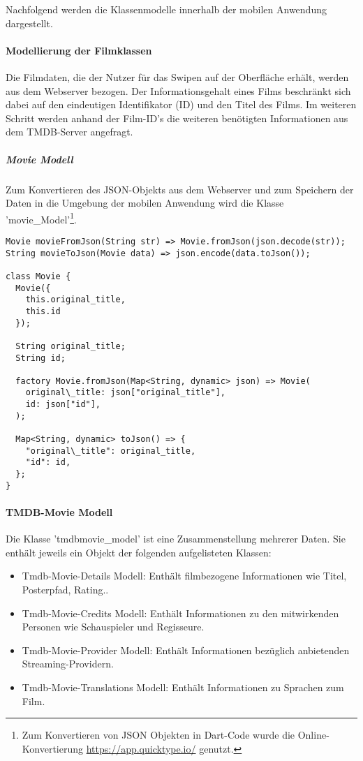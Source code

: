 Nachfolgend werden die Klassenmodelle innerhalb der mobilen Anwendung dargestellt.

\paragraph{Modellierung der Filmklassen}
Die Filmdaten, die der Nutzer für das Swipen auf der Oberfläche erhält, werden aus dem Webserver bezogen. Der Informationsgehalt eines Films beschränkt sich dabei auf den eindeutigen Identifikator (ID) und den Titel des Films.
Im weiteren Schritt werden anhand der Film-ID's die weiteren benötigten Informationen aus dem TMDB-Server angefragt. 

\subparagraph{Movie Modell}
Zum Konvertieren des JSON-Objekts aus dem Webserver und zum Speichern der Daten in die Umgebung der mobilen Anwendung wird die Klasse 'movie\_Model'\footnote{Zum Konvertieren von JSON Objekten in Dart-Code wurde die Online-Konvertierung \url{https://app.quicktype.io/} genutzt.}. 




\begin{lstlisting}[caption=Movie Modell - JSON Konvertierung, label=lst:moviemodel]
Movie movieFromJson(String str) => Movie.fromJson(json.decode(str));
String movieToJson(Movie data) => json.encode(data.toJson());

class Movie {
  Movie({
    this.original_title,
    this.id
  });

  String original_title;
  String id;

  factory Movie.fromJson(Map<String, dynamic> json) => Movie(
    original\_title: json["original_title"],
    id: json["id"],
  );

  Map<String, dynamic> toJson() => {
    "original\_title": original_title,
    "id": id,
  };
}
\end{lstlisting}


\paragraph{TMDB-Movie Modell}
Die Klasse 'tmdbmovie\_model' ist eine Zusammenstellung mehrerer Daten. Sie enthält jeweils ein Objekt der folgenden aufgelisteten Klassen:

\begin{itemize}
\item Tmdb-Movie-Details Modell: Enthält filmbezogene Informationen wie Titel, Posterpfad, Rating..
\item Tmdb-Movie-Credits Modell: Enthält Informationen zu den mitwirkenden Personen wie Schauspieler und Regisseure.
\item Tmdb-Movie-Provider Modell: Enthält Informationen bezüglich anbietenden Streaming-Providern.
\item Tmdb-Movie-Translations Modell: Enthält Informationen zu Sprachen zum Film.
\end{itemize}

